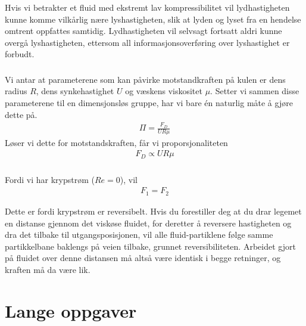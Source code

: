 \documentclass[12p,a4paper]{article}
\begin{document}
Hvis vi betrakter et fluid med ekstremt lav kompressibilitet vil lydhastigheten kunne komme vilkårlig nære lyshastigheten, slik at lyden og lyset fra en hendelse omtrent oppfattes samtidig. Lydhastigheten vil selvsagt fortsatt aldri kunne overgå lyshastigheten, ettersom all informasjonsoverføring over lyshastighet er forbudt.


\subsubsection{}
Vi antar at parameterene som kan påvirke motstandkraften på kulen er dens radius $R$, dens synkehastighet $U$ og væskens viskositet $\mu$. Setter vi sammen disse parameterene til en dimensjonsløs gruppe, har vi bare én naturlig måte å gjøre dette på.
\begin{align*}
\Pi = \frac{F_D}{U R \mu}
\end{align*}
Løser vi dette for motstandskraften, får vi proporsjonaliteten
\begin{align*}
    F_D \propto U R \mu
\end{align*}


\subsubsection{}
Fordi vi har krypstrøm ($Re=0$), vil
\begin{align*}
    F_1 = F_2
\end{align*}

Dette er fordi krypstrøm er reversibelt. Hvis du forestiller deg at du drar legemet en distanse gjennom det viskøse fluidet, for deretter å reversere hastigheten og dra det tilbake til utgangsposisjonen, vil alle fluid-partiklene følge samme partikkelbane baklengs på veien tilbake, grunnet reversibiliteten. Arbeidet gjort på fluidet over denne distansen må altså være identisk i begge retninger, og kraften må da være lik.


\section{Lange oppgaver}
\subsection{}
\end{document}
